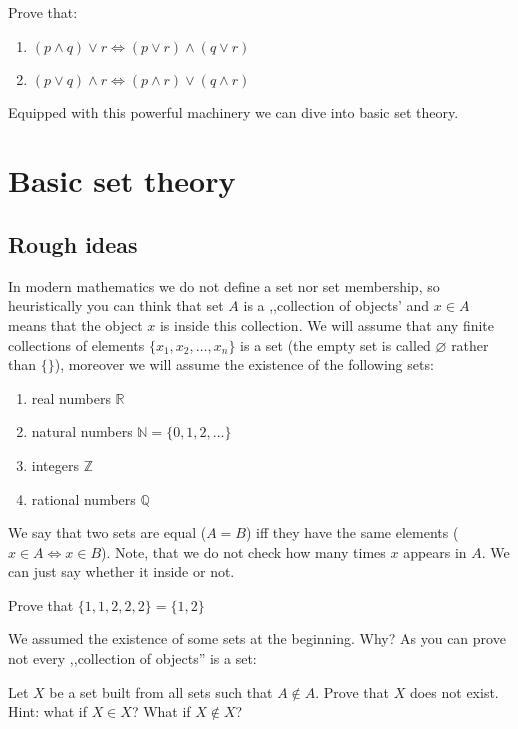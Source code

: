 \begin{prob}
Prove that:
  \begin{enumerate}
    \item $(p\wedge q)\vee r \Leftrightarrow (p\vee r) \wedge (q\vee r)$
    \item $(p\vee q)\wedge r \Leftrightarrow (p\wedge r) \vee (q\wedge r)$
  \end{enumerate}
\end{prob}

\noindent Equipped with this powerful machinery we can dive into basic set theory.

\section{Basic set theory}
\label{sec:basic_set_theory}

\subsection{Rough ideas}
In modern mathematics we do not define a set nor set membership, so heuristically you can think that set $A$
is a ,,collection of objects' and $x\in A$ means that the object $x$ is inside this collection. We will assume that any finite collections of elements $\{x_1, x_2, \dots, x_n\}$ is a set
(the empty set is called $\varnothing$ rather than $\{\}$), moreover we will assume the existence of the following sets:
\begin{enumerate}
	\item real numbers $\mathbb R$
	\item natural numbers $\mathbb N=\{0,1,2,\dots\}$
	\item integers $\mathbb Z$
	\item rational numbers $\mathbb Q$
\end{enumerate}

\noindent We say that two sets are equal ($A=B$) iff they have the same elements
($x\in A\Leftrightarrow x\in B$). Note, that we do not check how many times $x$ appears in $A$. We can
just say whether it inside or not.

\begin{prob}
Prove that $\{1,1,2,2,2\}=\{1,2\}$
\end{prob}

\noindent We assumed the existence of some sets at the beginning. Why? As you can prove not every ,,collection of objects'' is a set:

\begin{prob}
	Let $X$ be a set built from all sets such that $A\notin A.$ Prove that $X$ does not exist. Hint: what if $X\in X$? What if $X\notin X$?
\end{prob}

